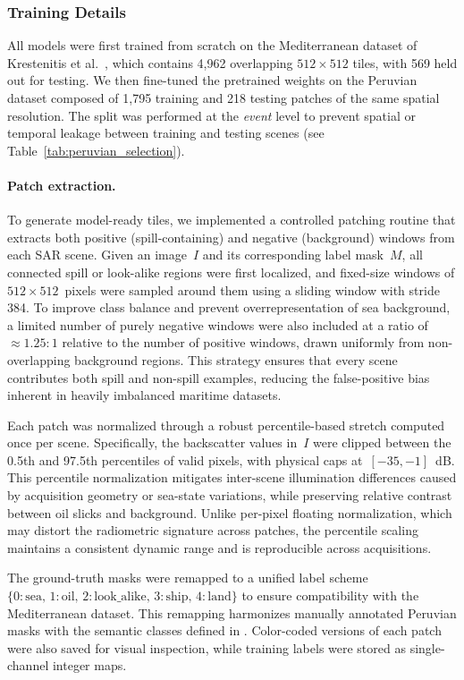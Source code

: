\documentclass[12pt]{article}
\begin{document}
\clearpage
\subsubsection{Training Details}
\label{sec:training}

All models were first trained from scratch on the Mediterranean dataset of Krestenitis et al.~\cite{krestenitisOilSpillIdentification2019}, 
which contains 4,962 overlapping $512\times512$ tiles, with 569 held out for testing. 
We then fine-tuned the pretrained weights on the Peruvian dataset composed of 1,795 training and 218 testing patches 
of the same spatial resolution. The split was performed at the \emph{event} level to prevent spatial or temporal leakage 
between training and testing scenes (see Table~\ref{tab:peruvian_selection}). 
\paragraph{Patch extraction.}
To generate model-ready tiles, we implemented a controlled patching routine that extracts
both positive (spill-containing) and negative (background) windows from each SAR scene.
Given an image~$I$ and its corresponding label mask~$M$, all connected spill or look-alike regions 
were first localized, and fixed-size windows of $512\times512$~pixels were sampled around them 
using a sliding window with stride 384. 
To improve class balance and prevent overrepresentation of sea background, 
a limited number of purely negative windows were also included at a ratio of $\approx1.25:1$
relative to the number of positive windows, drawn uniformly from non-overlapping
background regions. This strategy ensures that every scene contributes both spill and non-spill examples,
reducing the false-positive bias inherent in heavily imbalanced maritime datasets.

Each patch was normalized through a robust percentile-based stretch computed once per scene.
Specifically, the backscatter values in~$I$ were clipped between the 0.5th and 97.5th percentiles
of valid pixels, with physical caps at~$[-35, -1]$~dB.
This percentile normalization mitigates inter-scene illumination differences
caused by acquisition geometry or sea-state variations, while preserving
relative contrast between oil slicks and background.
Unlike per-pixel floating normalization, which may distort the radiometric signature across patches,
the percentile scaling maintains a consistent dynamic range and is reproducible across acquisitions.

The ground-truth masks were remapped to a unified label scheme 
$\{0{:}\text{sea},\,1{:}\text{oil},\,2{:}\text{look\_alike},\,3{:}\text{ship},\,4{:}\text{land}\}$ 
to ensure compatibility with the Mediterranean dataset.
This remapping harmonizes manually annotated Peruvian masks with the semantic classes defined in 
\cite{krestenitisOilSpillIdentification2019}.
Color-coded versions of each patch were also saved for visual inspection,
while training labels were stored as single-channel integer maps.
\end{document}

